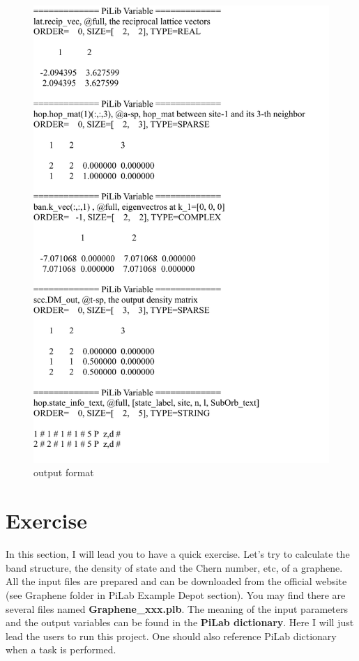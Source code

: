 \documentclass[10pt,a4paper]{article}
\begin{document}
\begin{figure}[tbp]
\centering
\includegraphics[width=0.8\columnwidth]{output_format.pdf}
\caption{output format}
\end{figure}

\section{Exercise}
In this section, I will lead you to have a quick exercise. Let's try to calculate the band structure, the density of state and the Chern number, etc, of a graphene. All the input files are prepared and can be downloaded from the official website (see Graphene folder in PiLab Example Depot section). You may find there are several files named \textbf{Graphene\_xxx.plb}. The meaning of the input parameters and the output variables can be found in the \textbf{PiLab dictionary}. Here I will just lead the users to run this project. One should also reference PiLab dictionary when a task is performed.    
\end{document}
